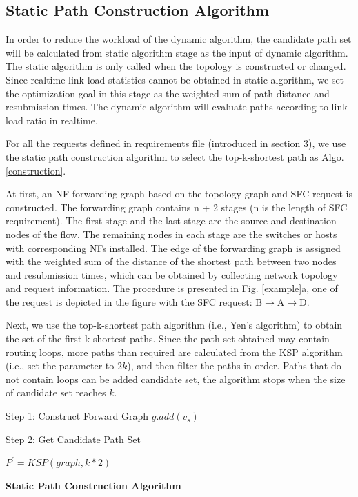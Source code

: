 \documentclass[10pt, conference, letterpaper]{IEEEtran}
\begin{document}
\subsection{Static Path Construction Algorithm}
In order to reduce the workload of the dynamic algorithm, the candidate path set will be calculated from static algorithm stage as the input of dynamic algorithm. 
The static algorithm is only called when the topology is constructed or changed. Since realtime link load statistics cannot be obtained in static algorithm, we set the optimization goal in this stage as the weighted sum of path distance and resubmission times. The dynamic algorithm will evaluate paths according to link load ratio in realtime.

For all the requests defined in requirements file (introduced in section 3), we use the static path construction algorithm to select the top-k-shortest path as Algo. \ref{construction}.

At first, an NF forwarding graph based on the topology graph and SFC request is constructed.
The forwarding graph contains n + 2 stages (n is the length of SFC requirement). The first stage and the last stage are the source and destination nodes of the flow. The remaining nodes in each stage are the switches or hosts with corresponding NFs installed. The edge of the forwarding graph is assigned with the weighted sum of the distance of the shortest path between two nodes and resubmission times, which can be obtained by collecting network topology and request information. The procedure is presented in Fig. \ref{example}a, one of the request is depicted in the figure with the SFC request: B$\rightarrow$A$\rightarrow$D.

Next, we use the top-k-shortest path algorithm (i.e., Yen's algorithm) to obtain the set of the first k shortest paths. 
Since the path set obtained may contain routing loops, more paths than required are calculated from the KSP algorithm (i.e., set the parameter to $2k$), and then filter the paths in order. Paths that do not contain loops can be added candidate set, the algorithm stops when the size of candidate set reaches $k$.


\begin{algorithm}[t]
Step 1: Construct Forward Graph
$g.add(v_s)$

Step 2: Get Candidate Path Set

$P^{\prime} = KSP(graph, k*2)$

\caption{{\bf Static Path Construction Algorithm} \label{construction}}
\end{algorithm}
\end{document}
